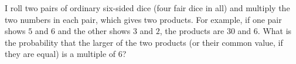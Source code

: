 I roll two pairs of ordinary six-sided dice (four fair dice in all) and multiply the two numbers in each pair, which gives two products. For example, if one pair shows $5$ and $6$ and the other shows $3$ and $2$, the products are $30$ and $6$. What is the probability that the larger of the two products (or their common value, if they are equal) is a multiple of $6$?
